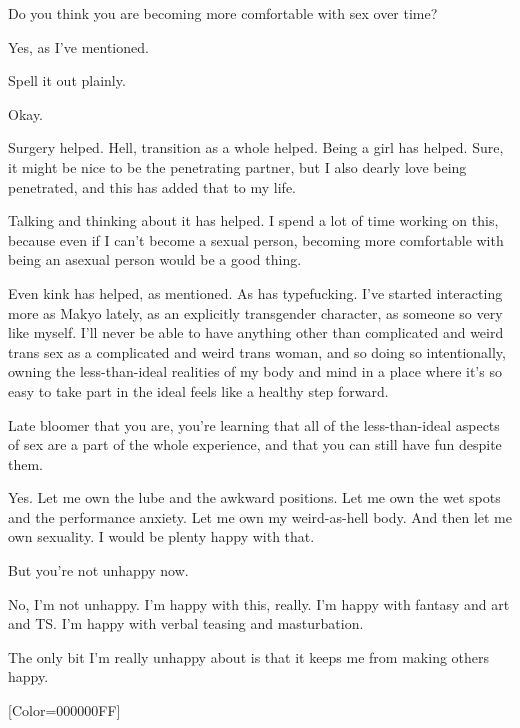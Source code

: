 \begin{paracol}{2}
\begin{leftcolumn}
\begin{ally}
Do you think you are becoming more comfortable with sex over time?
\end{ally}
Yes, as I've mentioned.

\begin{ally}
Spell it out plainly.
\end{ally}
Okay.

Surgery helped. Hell, transition as a whole helped. Being a girl has helped. Sure, it might be nice to be the penetrating partner, but I also dearly love being penetrated, and this has added that to my life.

Talking and thinking about it has helped. I spend a lot of time working on this, because even if I can't become a sexual person, becoming more comfortable with being an asexual person would be a good thing.

Even kink has helped, as mentioned. As has typefucking. I've started interacting more as Makyo lately, as an explicitly transgender character, as someone so very like myself. I'll never be able to have anything other than complicated and weird trans sex as a complicated and weird trans woman, and so doing so intentionally, owning the less-than-ideal realities of my body and mind in a place where it's so easy to take part in the ideal feels like a healthy step forward.

\begin{ally}
Late bloomer that you are, you're learning that all of the less-than-ideal aspects of sex are a part of the whole experience, and that you can still have fun despite them.
\end{ally}
Yes. Let me own the lube and the awkward positions. Let me own the wet spots and the performance anxiety. Let me own my weird-as-hell body. And then let me own sexuality. I would be plenty happy with that.

\begin{ally}
But you're not unhappy now.
\end{ally}
No, I'm not unhappy. I'm happy with this, really. I'm happy with fantasy and art and TS. I'm happy with verbal teasing and masturbation.

The only bit I'm really unhappy about is that it keeps me from making others happy.
\newpage
\end{leftcolumn}
\end{paracol}
\resetbackgroundcolor

\renewfontfamily{}[Color=000000FF]
